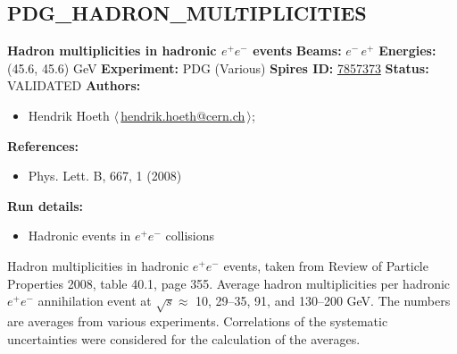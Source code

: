 \clearpage


\clearpage

\subsection[PDG\_HADRON\_MULTIPLICITIES]{PDG\_HADRON\_MULTIPLICITIES\,\cite{Amsler:2008zzb}}
\textbf{Hadron multiplicities in hadronic $e^+e^-$ events}\newline
\textbf{Beams:} $e^-$\,$e^+$ \newline
\textbf{Energies:} (45.6, 45.6) GeV \newline
\textbf{Experiment:} PDG (Various) \newline
\textbf{Spires ID:} \href{http://www.slac.stanford.edu/spires/find/hep/www?rawcmd=key+7857373}{7857373}\newline
\textbf{Status:} VALIDATED\newline
\textbf{Authors:}
\begin{itemize}
  \item Hendrik Hoeth $\langle\,$\href{mailto:hendrik.hoeth@cern.ch}{hendrik.hoeth@cern.ch}$\,\rangle$;
\end{itemize}
\textbf{References:}
\begin{itemize}
  \item Phys. Lett. B, 667, 1 (2008)
\end{itemize}
\textbf{Run details:}
\begin{itemize}

  \item Hadronic events in $e^+ e^-$ collisions\end{itemize}

\noindent Hadron multiplicities in hadronic $e^+e^-$ events, taken from Review of Particle Properties 2008, table 40.1, page 355.   Average hadron multiplicities per hadronic $e^+e^-$ annihilation event at $\sqrt{s} \approx {}$ 10, 29--35, 91, and 130--200 GeV. The numbers are averages from various experiments. Correlations of the systematic uncertainties were considered for the calculation of the averages.

\clearpage


\clearpage

